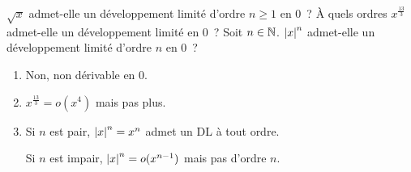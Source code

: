 \documentclass{magnolia}
\begin{document}
\begin{questions}
\question $\sqrt{x}$ admet-elle un développement limité d'ordre $n\geq 1$ en
  0~?
\question À quels ordres $x^{\frac{13}{3}}$ admet-elle un développement
  limité en 0~?
\question Soit $n\in\mathbb{N}$. $\left|x\right|^n$ admet-elle un développement limité
  d'ordre $n$ en 0~? 
\end{questions}

\begin{sol}
\begin{enumerate}
\item Non, non dérivable en $0$.
\item  $x^{\frac{13}{3}} = o(x^4)$ mais pas plus.
\item Si $n$ est pair, $\left|x\right|^n = x^n$ admet un DL à tout ordre.

  Si $n$ est impair, $\left|x\right|^n =o(x^{n-1})$ mais pas d'ordre $n$.
\end{enumerate}
\end{sol}

\end{document}
